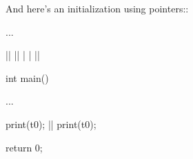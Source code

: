 And here's an initialization using pointers::

\begin{consolethree}[escapeinside=||]
...

||
|\EMPHASIZE{\{}|
|  |
|\EMPHASIZE{\}}|

int main()
{
  ...

  print(t0);
  ||
  print(t0);

  return 0;
}
\end{consolethree}


